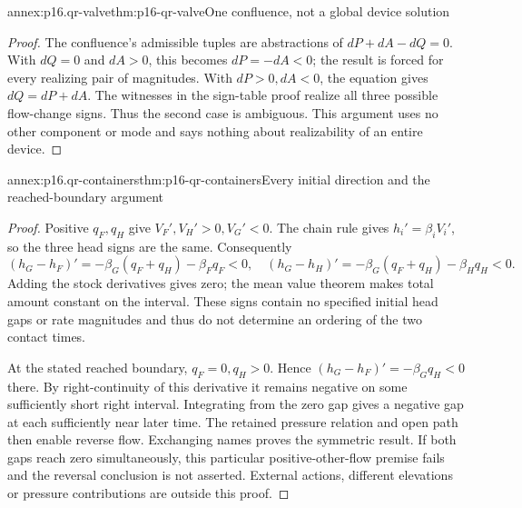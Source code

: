 \begin{annexitem}{annex:p16.qr-valve}{thm:p16-qr-valve}{One confluence, not a global device solution}
\begin{proof}
The confluence's admissible tuples are abstractions of
\(dP+dA-dQ=0\). With \(dQ=0\) and \(dA>0\), this becomes
\(dP=-dA<0\); the result is forced for every realizing pair of magnitudes.
With \(dP>0,dA<0\), the equation gives \(dQ=dP+dA\).
The witnesses in the sign-table proof realize all three possible flow-change
signs. Thus the second case is ambiguous. This argument uses no other
component or mode and says nothing about realizability of an entire device.
\end{proof}
\end{annexitem}
\begin{annexitem}{annex:p16.qr-containers}{thm:p16-qr-containers}{Every initial direction and the reached-boundary argument}
\begin{proof}
Positive \(q_F,q_H\) give \(V_F',V_H'>0,V_G'<0\).
The chain rule gives \(h_i'=\beta_iV_i'\), so the three head signs
are the same. Consequently
\[
 (h_G-h_F)'=-\beta_G(q_F+q_H)-\beta_Fq_F<0,
 \quad (h_G-h_H)'=-\beta_G(q_F+q_H)-\beta_Hq_H<0.
\]
Adding the stock derivatives gives zero; the mean value theorem makes
total amount constant on the interval. These signs contain no specified
initial head gaps or rate magnitudes and thus do not determine an ordering
of the two contact times.

At the stated reached boundary, \(q_F=0,q_H>0\). Hence
\((h_G-h_F)'=-\beta_Gq_H<0\) there. By right-continuity of this
derivative it remains negative on some sufficiently short right interval.
Integrating from the zero gap gives a negative gap at each sufficiently
near later time. The retained pressure relation and open path then enable
reverse flow. Exchanging names proves the symmetric result. If both gaps
reach zero simultaneously, this particular positive-other-flow premise
fails and the reversal conclusion is not asserted. External actions,
different elevations or pressure contributions are outside this proof.
\end{proof}
\end{annexitem}

